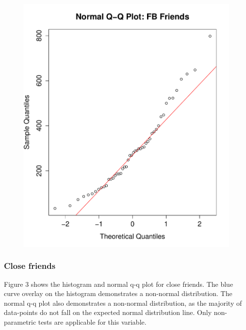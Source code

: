 \begin{figure}[H]
\includegraphics[scale=0.35]{./img/qqplot_fbfriends.pdf}
\end{figure}

\subsubsection{Close friends}

Figure 3 shows the histogram and normal q-q plot for close friends. The blue curve overlay on the histogram demonstrates a non-normal distribution. The normal q-q plot also demonstrates a non-normal distribution, as the majority of data-points do not fall on the expected normal distribution line. Only non-parametric tests are applicable for this variable.

